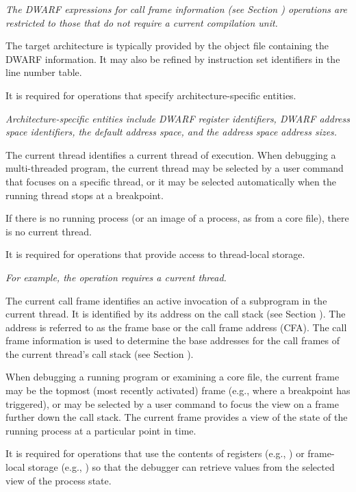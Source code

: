 \begin{enumerate}[1. ]
\textit{The DWARF expressions for call frame information (see Section
  ) operations are restricted
  to those that do not require a current compilation unit.}


The target architecture is typically provided by the object file
containing the DWARF information. It may also be refined by
instruction set identifiers in the line number table.

It is required for operations that specify architecture-specific
entities.

\textit{Architecture-specific entities include DWARF register
  identifiers, DWARF address space identifiers, the default address
  space, and the address space address sizes.}

The current thread identifies a current thread of execution. When
debugging a multi-threaded program, the current thread may be selected
by a user command that focuses on a specific thread, or it may be
selected automatically when the running thread stops at a breakpoint.

If there is no running process (or an image of a process, as from a
core file), there is no current thread.

It is required for operations that provide access to thread-local
storage.

\textit{For example, the \DWOPformtlsaddress operation requires a
  current thread.}

The current call frame identifies an active invocation of a subprogram
in the current thread. It is identified by its address on the call
stack (see Section ). The address is referred
to as the frame base or the call frame address (CFA). The call frame
information is used to determine the base addresses for the call
frames of the current thread’s call stack (see Section
).

When debugging a running program or examining a core file, the current
frame may be the topmost (most recently activated) frame (e.g., where
a breakpoint has triggered), or may be selected by a user command to
focus the view on a frame further down the call stack. The current
frame provides a view of the state of the running process at a
particular point in time.

It is required for operations that use the contents of registers
(e.g., \DWOPregSTAR) or frame-local storage (e.g., \DWOPfbreg) so that
the debugger can retrieve values from the selected view of the process
state.


\end{enumerate}
